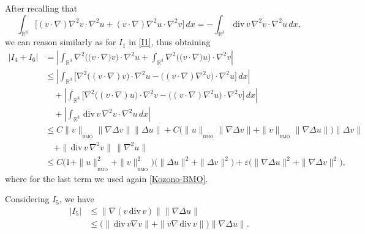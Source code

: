 \documentclass[a4paper]{article}
\newcommand{\dx}{\, dx}
\newcommand{\R}{\mathbb{R}}
\providecommand{\dv}{\,\mathrm{div}\,}
\begin{document}
  After recalling that
\begin{equation*}
  \int_{\R^3} \big[(v\cdot \nabla ) \nabla^2 v \cdot \nabla^2 u
  +  (v\cdot \nabla ) \nabla^2 u \cdot \nabla^2 v \big]\dx =
  -  \int_{\R^3}  \dv v\, \nabla^2 v \cdot \nabla^2 u \dx,
\end{equation*}
we can reason similarly as for $I_1$ in \eqref{I1}, thus obtaining
%
\begin{equation} \label{e:I4-I6}
  \begin{aligned}
    |I_4+I_6|& = \left|\int_{\mathbb{R}^3}\nabla^2\big(\big(v\cdot
      \nabla\big)v\big)\cdot \nabla^2 u + \int_{\mathbb{R}^3} \nabla^2
      \big(\big(v\cdot \nabla\big)u\big)\cdot \nabla^2 v \right|
    \\
    &\le \left|\int_{\R^3}\big[ \nabla^2 \big((v\cdot \nabla
      )v\big)\cdot \nabla^2 u - \big((v\cdot \nabla ) \nabla^2
      v\big)\cdot \nabla^2 u \big]\dx\right|
    \\
    & \quad+ \left|\int_{\R^3}\big[ \nabla^2 \big((v\cdot \nabla
      )u\big)\cdot \nabla^2 v - \big((v\cdot \nabla ) \nabla^2
      u\big)\cdot \nabla^2 v \big]\dx\right|
    \\
    & \quad+  \left|\int_{\R^3}  \dv v \,\nabla^2 v \cdot \nabla^2 u \dx\right|\\
    &\leq C \|v\|_{{}_{\textrm{BMO}}}\|\nabla\Delta v\|\|\Delta u\| +C
    \big(\|u\|_{{}_{\textrm{BMO}}}\|\nabla\Delta v\|
    + \|v\|_{{}_{\textrm{BMO}}} \| \nabla \Delta u\|\big)\|\Delta v\|\\
    & \quad +\|\dv v\, \nabla^2 v\|\, \| \nabla^2 u\|\\
    &\leq C\big(1 + \|u\|_{{}_{\textrm{BMO}}}^2+ \|v\|_{{}_{\textrm{BMO}}}^2
    \big)\big(\|\Delta u\|^2+\|\Delta v\|^2 \big) + \varepsilon
    \big(\|\nabla\Delta u\|^2+\|\nabla\Delta v\|^2 \big),
  \end{aligned}
\end{equation}
where for the last term we used again \eqref{Kozono-BMO}.

Considering $I_{5}$, we have
%
\begin{equation}
  \begin{aligned}
    \label{I5}
    |I_{5}|&\leq \|\nabla (v\dv v )\|\|\nabla \Delta u\|
    \\
    & \leq \big(\|\dv v \nabla v \| +\| v \nabla \dv v \| \big)
    \|\nabla \Delta u\|.
  \end{aligned}
\end{equation}
%
\end{document}
